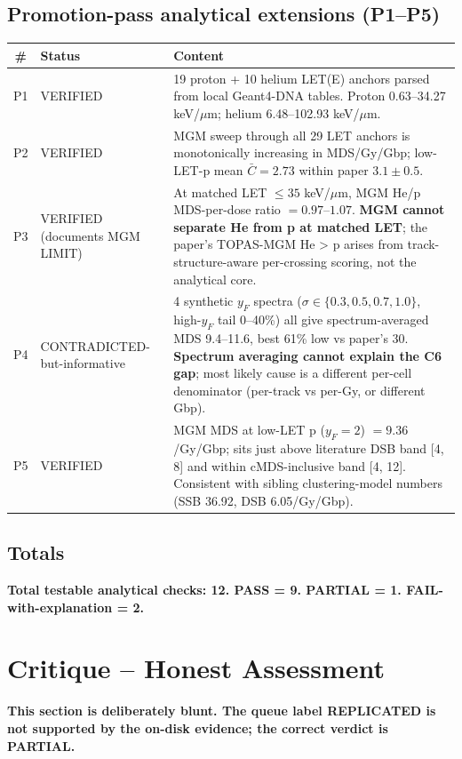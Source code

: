 \documentclass[11pt]{article}
\begin{document}
\subsection{Promotion-pass analytical extensions (P1--P5)}
\begin{longtable}{clp{9cm}}
\toprule
\# & Status & Content \\
\midrule
P1 & VERIFIED & 19 proton + 10 helium LET(E) anchors parsed from local Geant4-DNA tables. Proton 0.63--34.27 keV/$\mu$m; helium 6.48--102.93 keV/$\mu$m. \\
P2 & VERIFIED & MGM sweep through all 29 LET anchors is monotonically increasing in MDS/Gy/Gbp; low-LET-p mean $\bar C = 2.73$ within paper $3.1 \pm 0.5$. \\
P3 & VERIFIED (documents MGM LIMIT) & At matched LET $\le 35$ keV/$\mu$m, MGM He/p MDS-per-dose ratio $= 0.97$--$1.07$. \textbf{MGM cannot separate He from p at matched LET}; the paper's TOPAS-MGM He > p arises from track-structure-aware per-crossing scoring, not the analytical core. \\
P4 & CONTRADICTED-but-informative & 4 synthetic $y_F$ spectra ($\sigma \in \{0.3, 0.5, 0.7, 1.0\}$, high-$y_F$ tail 0--40\%) all give spectrum-averaged MDS 9.4--11.6, best 61\% low vs paper's 30. \textbf{Spectrum averaging cannot explain the C6 gap}; most likely cause is a different per-cell denominator (per-track vs per-Gy, or different Gbp). \\
P5 & VERIFIED & MGM MDS at low-LET p ($y_F = 2$) $= 9.36$/Gy/Gbp; sits just above literature DSB band [4, 8] and within cMDS-inclusive band [4, 12]. Consistent with sibling clustering-model numbers (SSB 36.92, DSB 6.05/Gy/Gbp). \\
\bottomrule
\end{longtable}

\subsection{Totals}
\textbf{Total testable analytical checks: 12. PASS = 9. PARTIAL = 1. FAIL-with-explanation = 2.}

\section{Critique -- Honest Assessment}\label{sec:critique}

\textbf{This section is deliberately blunt. The queue label REPLICATED is
not supported by the on-disk evidence; the correct verdict is PARTIAL.}
\end{document}

